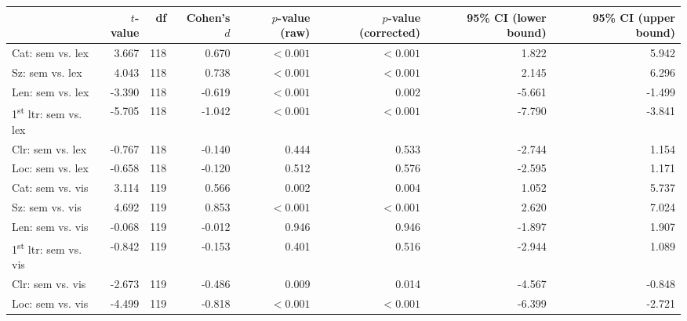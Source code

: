 \begin{tabular}{lrrrrrrr}
\toprule
{} & $t$-value &  df & Cohen's $d$ & $p$-value (raw) & $p$-value (corrected) & 95\% CI (lower bound) & 95\% CI (upper bound) \\
\midrule
Cat: sem vs. lex                       &     3.667 & 118 &       0.670 &       $< 0.001$ &             $< 0.001$ &                 1.822 &                 5.942 \\
Sz: sem vs. lex                        &     4.043 & 118 &       0.738 &       $< 0.001$ &             $< 0.001$ &                 2.145 &                 6.296 \\
Len: sem vs. lex                       &    -3.390 & 118 &      -0.619 &       $< 0.001$ &                 0.002 &                -5.661 &                -1.499 \\
1\textsuperscript{st} ltr: sem vs. lex &    -5.705 & 118 &      -1.042 &       $< 0.001$ &             $< 0.001$ &                -7.790 &                -3.841 \\
Clr: sem vs. lex                       &    -0.767 & 118 &      -0.140 &           0.444 &                 0.533 &                -2.744 &                 1.154 \\
Loc: sem vs. lex                       &    -0.658 & 118 &      -0.120 &           0.512 &                 0.576 &                -2.595 &                 1.171 \\
Cat: sem vs. vis                       &     3.114 & 119 &       0.566 &           0.002 &                 0.004 &                 1.052 &                 5.737 \\
Sz: sem vs. vis                        &     4.692 & 119 &       0.853 &       $< 0.001$ &             $< 0.001$ &                 2.620 &                 7.024 \\
Len: sem vs. vis                       &    -0.068 & 119 &      -0.012 &           0.946 &                 0.946 &                -1.897 &                 1.907 \\
1\textsuperscript{st} ltr: sem vs. vis &    -0.842 & 119 &      -0.153 &           0.401 &                 0.516 &                -2.944 &                 1.089 \\
Clr: sem vs. vis                       &    -2.673 & 119 &      -0.486 &           0.009 &                 0.014 &                -4.567 &                -0.848 \\
Loc: sem vs. vis                       &    -4.499 & 119 &      -0.818 &       $< 0.001$ &             $< 0.001$ &                -6.399 &                -2.721 \\

\end{tabular}
